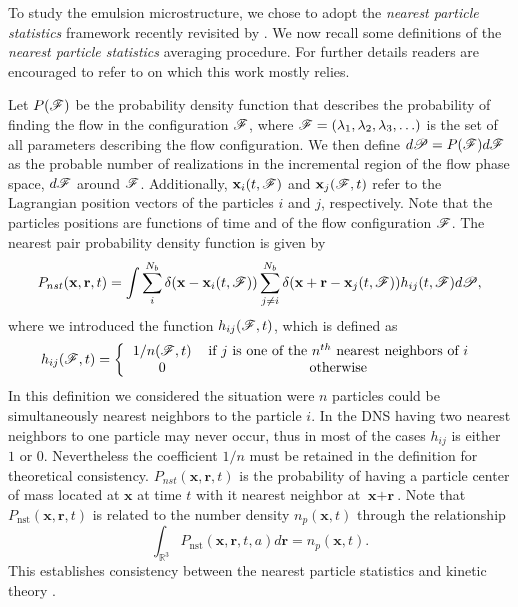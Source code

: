 
To study the emulsion microstructure, we chose to adopt the \textit{nearest particle statistics} framework recently revisited by \citet{zhang2021ensemble}.
We now recall some definitions of the \textit{nearest particle statistics} averaging procedure. 
For further details readers are encouraged to refer to \citet{zhang2023evolution} on which this work mostly relies.

Let $P(\mathscr{F})$ be the probability density function that describes the probability of finding the flow in the configuration $\mathscr{F}$, where $\mathscr{F} = (\lambda_1,\lambda_2,\lambda_3,\ldots)$ is the set of all parameters describing the flow configuration.
We then define $d\mathscr{P} = P(\mathscr{F})d\mathscr{F}$ as the probable number of realizations in the incremental region of the flow phase space, $d\mathscr{F}$ around $\mathscr{F}$.
Additionally,  $\textbf{x}_i(t,\mathscr{F})$ and $\textbf{x}_j(\mathscr{F},t)$ refer to the Lagrangian position vectors of the particles $i$ and $j$, respectively. 
Note that the particles positions are functions of time and of the flow configuration $\mathscr{F}$. 
The nearest pair probability density function is given by \citep{zhang2021ensemble,zhang2023evolution}
\begin{equation}
    P_{nst}(\textbf{x},\textbf{r},t)= 
    \int \sum_{i}^{N_b}\delta(\textbf{x}-\textbf{x}_i(t,\mathscr{F}))
    \sum_{j\neq i}^{N_b}\delta(\textbf{x}+\textbf{r}-\textbf{x}_j(t,\mathscr{F})) 
    h_{ij} (t,\mathscr{F})
    d\mathscr{P},
    \label{eq:P_nstij}
\end{equation}
where we introduced the function $h_{ij}(\mathscr{F},t)$, which is defined as
\begin{equation*}
    h_{ij}(\FF,t)
    = \left\{
        \begin{tabular}{cc}
            $1/n(\FF,t)$ & if $j$ is one of the $n^{th}$ nearest neighbors of $i$ \\
            0& otherwise
        \end{tabular}
        \right.
\end{equation*}
In this definition we considered the situation were $n$ particles could be simultaneously nearest neighbors to the particle $i$. 
In the DNS having two nearest neighbors to one particle may never occur, thus in most of the cases $h_{ij}$ is either $1$ or $0$. 
Nevertheless the coefficient $1/n$ must be retained in the definition for theoretical consistency.
$P_{nst}(\textbf{x},\textbf{r},t)$ is the probability of having a particle center of mass located at $\textbf{x}$ at time $t$ with it nearest neighbor at $\textbf{x}+\textbf{r}$. 
Note that $P_\text{nst}(\textbf{x},\textbf{r},t)$ is related to the number density $n_p(\textbf{x},t)$ through the relationship
\begin{equation*}
    \int_{\mathbb{R}^3}
     P_\text{nst}(\textbf{x},\textbf{r},t,a) d\textbf{r}  = n_p(\textbf{x},t). 
    \label{eq:Pnst}
\end{equation*}
This establishes consistency between the nearest particle statistics and kinetic theory \citep{zhang2021ensemble}. 



